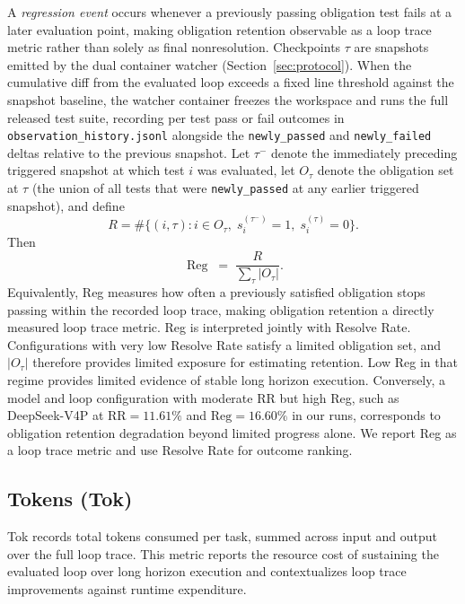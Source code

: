 A \emph{regression event} occurs whenever a previously passing obligation test fails at a later evaluation point, making obligation retention observable as a loop trace metric rather than solely as final nonresolution. Checkpoints $\tau$ are snapshots emitted by the dual container watcher (Section~\ref{sec:protocol}). When the cumulative diff from the evaluated loop exceeds a fixed line threshold against the snapshot baseline, the watcher container freezes the workspace and runs the full released test suite, recording per test pass or fail outcomes in \texttt{observation\_history.jsonl} alongside the \texttt{newly\_passed} and \texttt{newly\_failed} deltas relative to the previous snapshot. Let $\tau^-$ denote the immediately preceding triggered snapshot at which test $i$ was evaluated, let $O_\tau$ denote the obligation set at $\tau$ (the union of all tests that were \texttt{newly\_passed} at any earlier triggered snapshot), and define
\begin{equation}
R = \#\bigl\{(i,\tau): i \in O_\tau,\; s_i^{(\tau^-)} \!=\! 1,\; s_i^{(\tau)} \!=\! 0\bigr\}.
\end{equation}
Then
\begin{equation}
\operatorname{Reg} \;=\; \frac{R}{\sum_\tau |O_\tau|}.
\end{equation}
Equivalently, Reg measures how often a previously satisfied obligation stops passing within the recorded loop trace, making obligation retention a directly measured loop trace metric.
Reg is interpreted jointly with Resolve Rate. Configurations with very low Resolve Rate satisfy a limited obligation set, and $|O_\tau|$ therefore provides limited exposure for estimating retention. Low Reg in that regime provides limited evidence of stable long horizon execution. Conversely, a model and loop configuration with moderate RR but high Reg, such as DeepSeek-V4P at $\text{RR}{=}11.61\%$ and $\text{Reg}{=}16.60\%$ in our runs, corresponds to obligation retention degradation beyond limited progress alone. We report Reg as a loop trace metric and use Resolve Rate for outcome ranking.

\subsection{Tokens (Tok)}\label{app:tokens}

Tok records total tokens consumed per task, summed across input and output over the full loop trace. This metric reports the resource cost of sustaining the evaluated loop over long horizon execution and contextualizes loop trace improvements against runtime expenditure.
